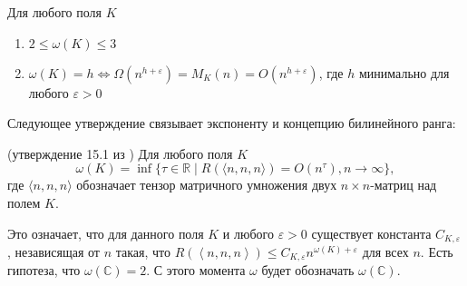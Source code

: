 \begin{prop}\label{prop:mol:2.11}
     Для любого поля $K$
	\begin{enumerate}
	     \item $2 \leq \omega(K) \leq 3$
	     \item $\omega(K) = h \iff \Omega(n^{h + \varepsilon}) = M_K(n) = O(n^{h + \varepsilon})$, где $h$ минимально для любого $\varepsilon > 0$
	\end{enumerate}
\end{prop}

Следующее утверждение связывает экспоненту и концепцию билинейного ранга:
\begin{prop}\label{prop:bur:15.1}(утверждение 15.1 из \cite[376-377]{bur})
Для любого поля $K$
	\[
		\omega(K) = \inf \{ \tau \in \mathbb{R} \mid R(\langle n,n,n \rangle) = O(n^\tau), n \to \infty \},
	\]
	где $\langle n,n,n \rangle$ обозначает тензор матричного умножения двух $n \times n$-матриц над полем $K$.  
\end{prop}
Это означает, что для данного поля $K$ и любого $\varepsilon > 0$ существует константа $C_{K, \varepsilon}$, независящая от $n$ такая, что $R(\left\langle n,n,n \right\rangle) \leq C_{K,\varepsilon} n^{\omega(K)+\varepsilon}$ для всех $n$. Есть гипотеза, что $\omega(\mathbb{C}) = 2$. С этого момента $\omega$ будет обозначать $\omega(\mathbb{C})$.

